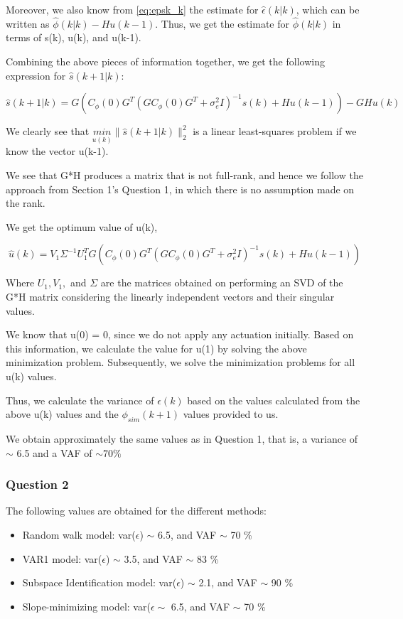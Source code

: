 \documentclass[12pt]{report}
\begin{document}
Moreover, we also know from \ref{eq:epsk_k} the estimate for $\hat\epsilon(k|k)$, which can be written as $\hat\phi(k|k) - Hu(k-1)$. Thus, we get the estimate for $\hat\phi(k|k)$ in terms of s(k), u(k), and u(k-1).

Combining the above pieces of information together, we get the following expression for $\hat{s}(k+1|k)$:

\begin{equation*}
\hat s(k+1|k) = G\left( C_{\phi}(0)G^{T}(GC_{\phi}(0)G^{T} + \sigma_{e}^{2}I)^{-1}s(k) + Hu(k-1)\right) - GHu(k)
\end{equation*}

We clearly see that $\underset{u(k)}{min}\|\hat s(k+1|k)\|_{2}^{2}$ is a linear least-squares problem if we know the vector u(k-1).

We see that G*H produces a matrix that is not full-rank, and hence we follow the approach from Section 1's Question 1, in which there is no assumption made on the rank.

We get the optimum value of u(k), 

\begin{equation*}
\hat{u}(k) = V_{1}\Sigma^{-1}U_{1}^{T}G\left( C_{\phi}(0)G^{T}(GC_{\phi}(0)G^{T} + \sigma_{e}^{2}I)^{-1}s(k) + Hu(k-1)\right)
\end{equation*}

Where $U_{1}, V_{1},$ and $\Sigma$ are the matrices obtained on performing an SVD of the G*H matrix considering the linearly independent vectors and their singular values.

We know that u(0) = 0, since we do not apply any actuation initially. Based on this information, we calculate the value for u(1) by solving the above minimization problem. Subsequently, we solve the minimization problems for all u(k) values.

Thus, we calculate the variance of $\epsilon(k)$ based on the values calculated from the above u(k) values and the $\phi_{sim}(k+1)$ values provided to us.

We obtain approximately the same values as in Question 1, that is, a variance of $\sim$ 6.5 and a VAF of $\sim 70 \%$

\subsubsection*{Question 2}

The following values are obtained for the different methods:

\begin{itemize}
	\item Random walk model: var($\epsilon$) $\sim$ 6.5, and VAF $\sim$ 70 \%
	\item VAR1 model: var($\epsilon$) $\sim$ 3.5, and VAF $\sim$ 83 \%
	\item Subspace Identification model: var($\epsilon$) $\sim$ 2.1, and VAF $\sim$ 90 \%
	\item Slope-minimizing model: var($\epsilon \sim$ 6.5, and VAF $\sim$ 70 \%
\end{itemize}
\end{document}
